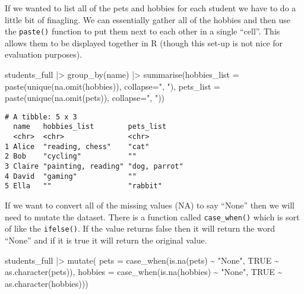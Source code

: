 \documentclass[
  letterpaper,
  DIV=11,
  numbers=noendperiod]{scrreprt}
\newenvironment{Shaded}{\begin{snugshade}}{\end{snugshade}}
\newcommand{\AttributeTok}[1]{\textcolor[rgb]{0.40,0.45,0.13}{#1}}
\newcommand{\ConstantTok}[1]{\textcolor[rgb]{0.56,0.35,0.01}{#1}}
\newcommand{\FunctionTok}[1]{\textcolor[rgb]{0.28,0.35,0.67}{#1}}
\newcommand{\NormalTok}[1]{\textcolor[rgb]{0.00,0.23,0.31}{#1}}
\newcommand{\SpecialCharTok}[1]{\textcolor[rgb]{0.37,0.37,0.37}{#1}}
\newcommand{\StringTok}[1]{\textcolor[rgb]{0.13,0.47,0.30}{#1}}
\begin{document}
If we wanted to list all of the pets and hobbies for each student we
have to do a little bit of finagling. We can essentially gather all of
the hobbies and then use the \texttt{paste()} function to put them next
to each other in a single ``cell''. This allows them to be displayed
together in R (though this set-up is not nice for evaluation purposes).

\begin{Shaded}
\begin{Highlighting}[]
\NormalTok{students\_full }\SpecialCharTok{|\textgreater{}}
  \FunctionTok{group\_by}\NormalTok{(name) }\SpecialCharTok{|\textgreater{}}
  \FunctionTok{summarise}\NormalTok{(}\AttributeTok{hobbies\_list =} \FunctionTok{paste}\NormalTok{(}\FunctionTok{unique}\NormalTok{(}\FunctionTok{na.omit}\NormalTok{(hobbies)), }\AttributeTok{collapse=}\StringTok{", "}\NormalTok{), }
            \AttributeTok{pets\_list =} \FunctionTok{paste}\NormalTok{(}\FunctionTok{unique}\NormalTok{(}\FunctionTok{na.omit}\NormalTok{(pets)), }\AttributeTok{collapse=}\StringTok{", "}\NormalTok{)) }
\end{Highlighting}
\end{Shaded}

\begin{verbatim}
# A tibble: 5 x 3
  name   hobbies_list        pets_list    
  <chr>  <chr>               <chr>        
1 Alice  "reading, chess"    "cat"        
2 Bob    "cycling"           ""           
3 Claire "painting, reading" "dog, parrot"
4 David  "gaming"            ""           
5 Ella   ""                  "rabbit"     
\end{verbatim}

If we want to convert all of the missing values (NA) to say ``None''
then we will need to mutate the dataset. There is a function called
\texttt{case\_when()} which is sort of like the \texttt{ifelse()}. If
the value returns false then it will return the word ``None'' and if it
is true it will return the original value.

\begin{Shaded}
\begin{Highlighting}[]
\NormalTok{students\_full }\SpecialCharTok{|\textgreater{}}
  \FunctionTok{mutate}\NormalTok{( }\AttributeTok{pets =} \FunctionTok{case\_when}\NormalTok{(}\FunctionTok{is.na}\NormalTok{(pets) }\SpecialCharTok{\textasciitilde{}} \StringTok{"None"}\NormalTok{, }\ConstantTok{TRUE} \SpecialCharTok{\textasciitilde{}} \FunctionTok{as.character}\NormalTok{(pets)),}
          \AttributeTok{hobbies =} \FunctionTok{case\_when}\NormalTok{(}\FunctionTok{is.na}\NormalTok{(hobbies) }\SpecialCharTok{\textasciitilde{}} \StringTok{"None"}\NormalTok{, }\ConstantTok{TRUE} \SpecialCharTok{\textasciitilde{}} \FunctionTok{as.character}\NormalTok{(hobbies)))}
\end{Highlighting}
\end{Shaded}
\end{document}
